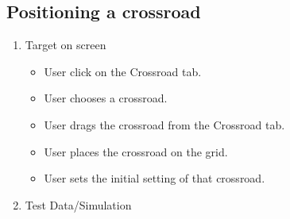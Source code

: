 \newpage

\subsection{Positioning a crossroad}

\begin{enumerate}

	\item Target on screen
	\begin{itemize}
		\item User click on the Crossroad tab.
		\item User chooses a crossroad.
		\item User drags the crossroad from the Crossroad tab.
		\item User places the crossroad on the grid.
		\item User sets the initial setting of that crossroad.
	\end{itemize}
	\item Test Data/Simulation
\end{enumerate}	
